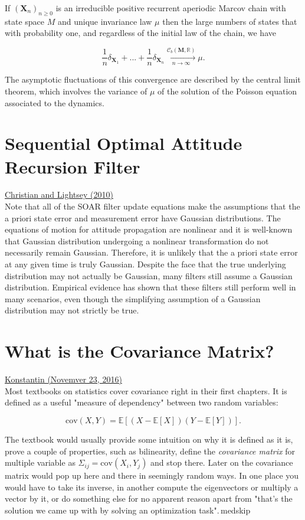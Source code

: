 \documentclass{article}
\begin{document}
If $(\bm{X}_{n})_{n\ge 0}$ is an irreducible positive recurrent aperiodic Marcov chain with state space $M$ and unique invariance law $\mu$ then the large numbers of states that with probability one, and regardless of the initial law of the chain, we have

$$
  \frac{1}{n}\delta_{\bm{X}_{1}} + ... + \frac{1}{n}\delta_{\bm{X}_{n}}\xrightarrow[n\rightarrow \infty]{\mathcal{C}_{b}(\bm{M},\mathbb{R})}\mu.
$$

The asymptotic fluctuations of this convergence are described by the central limit theorem, which involves the variance of $\mu$ of the solution of the Poisson equation associated to the dynamics.

\section{Sequential Optimal Attitude Recursion Filter}
\href{https://arc.aiaa.org/doi/10.2514/1.49561}{Christian and Lightsey (2010)}\\

Note that all of the SOAR filter update equations make the assumptions that the a priori state error and measurement error have Gaussian distributions. The equations of motion for attitude propagation are nonlinear and it is well-known that Gaussian distribution undergoing a nonlinear transformation do not necessarily remain Gaussian. Therefore, it is unlikely that the a priori state error at any given time is truly Gaussian. Despite the face that the true underlying distribution may not actually be Gaussian, many filters still assume a Gaussian distribution. Empirical evidence has shown that these filters still perform well in many scenarios, even though the simplifying assumption of a Gaussian distribution may not strictly be true.

\section{What is the Covariance Matrix?}
\href{https://fouryears.eu/2016/11/23/what-is-the-covariance-matrix/}{Konstantin (Novemver 23, 2016)}\\

Most textbooks on statistics cover covariance right in their first chapters. It is defined as a useful "measure of dependency" between two random variables:

$$
  \text{cov}(X, Y) = \mathbb{E}[(X - \mathbb{E}[X])(Y-\mathbb{E}[Y])].
$$

The textbook would usually provide some intuition on why it is defined as it is, prove a couple of properties, such as bilinearity, define the \textit{covariance matrix} for multiple variable as $\Sigma_{ij} = \text{cov}(X_{i},Y_{j})$ and stop there. Later on the covariance matrix would pop up here and there in seemingly random ways. In one place you would have to take its inverse, in another compute the eigenvectors or multiply a vector by it, or do something else for no apparent reason apart from "that's the solution we came up with by solving an optimization task".\,medskip
\end{document}
